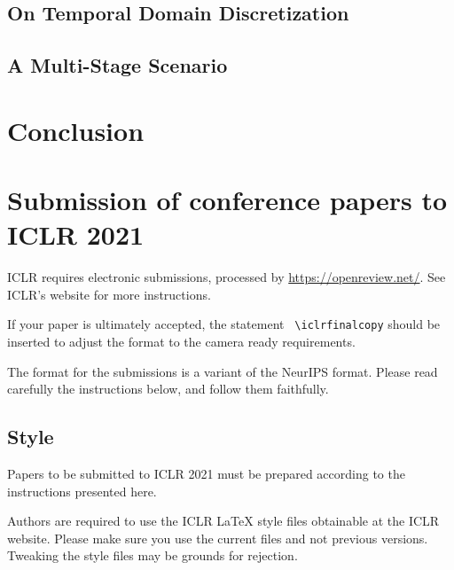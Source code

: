 \documentclass{article}
\begin{document}
\subsection{On Temporal Domain Discretization}
\label{subsec: On Temporal Domain Discretization}

\lipsum[92]

\subsection{A Multi-Stage Scenario}
\label{subsec: A Multi-Stage Scenario}

\lipsum[84]

\section{Conclusion}
\label{sec: Conclusion}

\lipsum[20]

\section*{Submission of conference papers to ICLR 2021}

ICLR requires electronic submissions, processed by
\url{https://openreview.net/}. See ICLR's website for more instructions.

If your paper is ultimately accepted, the statement {\tt
  {\textbackslash}iclrfinalcopy} should be inserted to adjust the
format to the camera ready requirements.

The format for the submissions is a variant of the NeurIPS format.
Please read carefully the instructions below, and follow them
faithfully.

\subsection*{Style}

Papers to be submitted to ICLR 2021 must be prepared according to the
instructions presented here.


Authors are required to use the ICLR \LaTeX{} style files obtainable at the
ICLR website. Please make sure you use the current files and
not previous versions. Tweaking the style files may be grounds for rejection.
\end{document}
